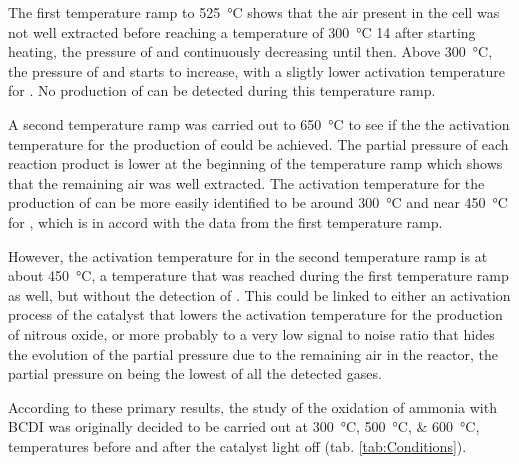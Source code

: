 The first temperature ramp to \qty{525}{\degreeCelsius} shows that the air present in the cell was not well extracted before reaching a temperature of \qty{300}{\degreeCelsius} \qty{14}{\min} after starting heating, the pressure of \nitrogen and \water continuously decreasing until then.
Above \qty{300}{\degreeCelsius}, the pressure of \nitrogen and \nitricoxide starts to increase, with a sligtly lower activation temperature for \nitrogen.
No production of \nitrousoxide can be detected during this temperature ramp.

A second temperature ramp was carried out to \qty{650}{\degreeCelsius} to see if the the activation temperature for the production of \nitrousoxide could be achieved.
The partial pressure of each reaction product is lower at the beginning of the temperature ramp which shows that the remaining air was well extracted.
The activation temperature for the production of \nitrogen can be more easily identified to be around \qty{300}{\degreeCelsius} and near \qty{450}{\degreeCelsius} for \nitricoxide, which is in accord with the data from the first temperature ramp.

However, the activation temperature for \nitrousoxide in the second temperature ramp is at about \qty{450}{\degreeCelsius}, a temperature that was reached during the first temperature ramp as well, but without the detection of \nitrousoxide.
This could be linked to either an activation process of the catalyst that lowers the activation temperature for the production of nitrous oxide, or more probably to a very low signal to noise ratio that hides the evolution of the partial pressure due to the remaining air in the reactor, the partial pressure on \nitrousoxide being the lowest of all the detected gases.

According to these primary results, the study of the oxidation of ammonia with BCDI was originally decided to be carried out at \qtylist{300;500;600}{\degreeCelsius}, temperatures before and after the catalyst light off (tab. \ref{tab:Conditions}).

